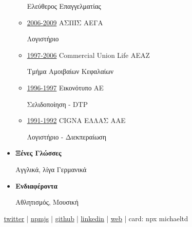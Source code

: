 \documentclass[11pt]{article}
\begin{document}
\begin{itemize}
\begin{itemize}
Ελεύθερος Επαγγελματίας

\item \uline{2006-2009} ΑΣΠΙΣ ΑΕΓΑ

Λογιστήριο

\item \uline{1997-2006} Commercial Union Life ΑΕΑΖ

Τμήμα Αμοιβαίων Κεφαλαίων

\item \uline{1996-1997} Εικονότυπο ΑΕ

Σελιδοποίηση - DTP

\item \uline{1991-1992} CIGNA ΕΛΛΑΣ ΑΑΕ

Λογιστήριο - Διεκπεραίωση
\end{itemize}

\item \textbf{Ξένες Γλώσσες}

Αγγλικά, λίγα Γερμανικά

\item \textbf{Ενδιαφέροντα}

Αθλητισμός, Μουσική
\end{itemize}

\href{https://twitter.com/tsouchlarakismd}{twitter} | \href{https://npmjs.com/\~michaeltd}{npmjs} | \href{https://github.com/michaeltd}{github} | \href{https://linkedin.com/in/michaeltd}{linkedin} | \href{https://michael.heliohost.org/}{web} | card: npx michaeltd
\end{document}
